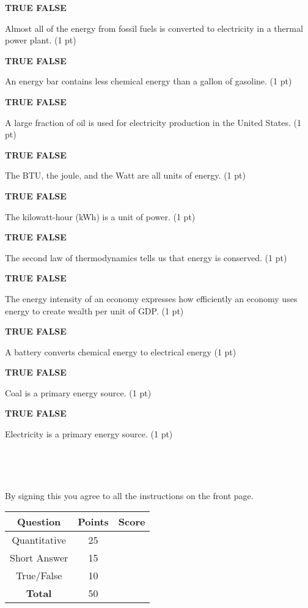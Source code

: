\documentclass[12pt, oneside]{article}
\newif\ifsolution
\newcommand{\tf}[1]
{
\vfill
\parbox[t]{0.25\textwidth}{\bf TRUE \hspace{0.1 in} FALSE }
\parbox[t]{0.75\textwidth}{#1 (1 pt)}
}
\newcommand{\tablerow}[2]
{\rule[-0.3cm]{0cm}{1cm}#1 & #2 & \\ \hline}
\newcommand{\solution}[1]
{\ifsolution
Answer: {\it #1}
\else\fi}
\begin{document}
%
\tf{Almost all of the energy from fossil fuels is converted to
electricity in a thermal power plant.}
\solution{False}

\tf{An energy bar contains less chemical energy than a gallon of
gasoline.}
\solution{True}

\tf{A large fraction of oil is used for electricity production in the
United States.}
\solution{False}

\tf{The BTU, the joule, and the Watt are all units of energy.}
\solution{False}

\tf{The kilowatt-hour (kWh) is a unit of power.}
\solution{False}

\tf{The second law of thermodynamics tells us that energy is conserved.}
\solution{False}

\tf{The energy intensity of an economy expresses how efficiently an
economy uses energy to create wealth per unit of GDP.}
\solution{True}

%
\tf{A battery converts chemical energy to electrical energy}
\solution{True}

\tf{Coal is a primary energy source.}
\solution{True}

\tf{Electricity is a primary energy source.}
\solution{False}


\newpage

\framebox[4.5in]{\rule{0cm}{1.5cm}}\\
\vspace{0.2cm}

\framebox[4.5in]{\rule{0cm}{1.5cm}}\\
\vspace{0.8cm}

By signing this you agree to all the instructions on the front page.

\vfill

\begin{center}
\begin{tabular}{|c|c|c|}
\hline
\rule[-0.3cm]{0cm}{1cm}
Question & Points & Score \\
\hline
\tablerow{Quantitative}{25}
\tablerow{Short Answer}{15}
\tablerow{True/False}{10}
\tablerow{\bf{Total}}{50}
\end{tabular}
\end{center}
\end{document}
